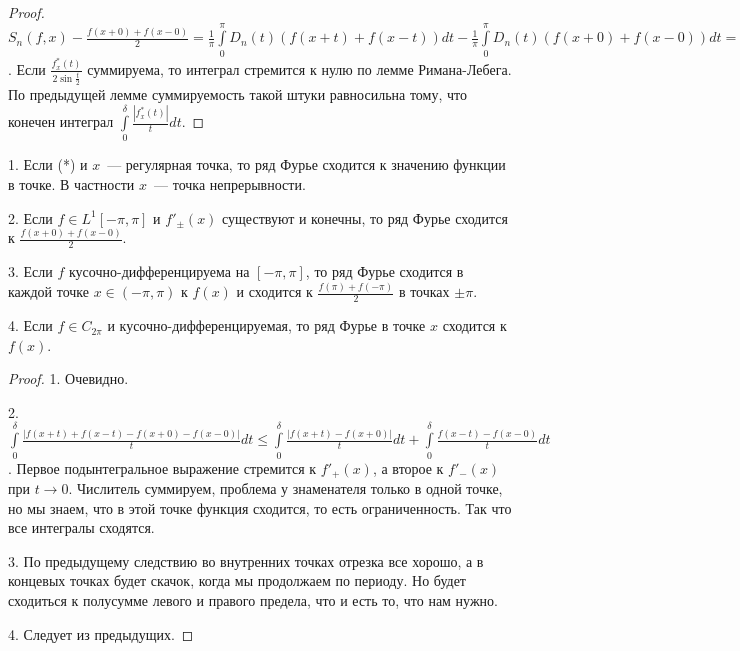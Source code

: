 \begin{proof}
    $S_n(f, x) - \frac{f(x + 0) + f(x - 0)}{2} = \frac{1}{\pi} \int \limits_{0}^{\pi} D_n(t) (f(x + t) + f(x - t)) dt -
        \frac{1}{\pi} \int \limits_{0}^{\pi} D_n(t) (f(x + 0) + f(x - 0)) dt = \frac{1}{\pi} \int \limits_{0}^{\pi} D_n(t) f_x^*(t) dt =
        \frac{1}{\pi} \int \limits_{0}^{\pi} \frac{f_x^*(t)}{2 \sin \frac{t}{2}} \sin (n + \frac{1}{2}) t dt$.
    Если $\frac{f_x^*(t)}{2 \sin \frac{t}{2}}$ суммируема, то интеграл стремится к нулю по лемме Римана-Лебега.
    По предыдущей лемме суммируемость такой штуки равносильна тому, что конечен интеграл
    $\int \limits_{0}^{\delta} \frac{|f_x^*(t)|}{t} dt$.
\end{proof}

\begin{consequence}
    1. Если (*) и $x$~--- регулярная точка, то ряд Фурье сходится к значению функции в точке. В частности $x$~--- точка непрерывности.

    2. Если $f \in L^1 [-\pi, \pi]$ и $f'_{\pm}(x)$ существуют и конечны, то ряд Фурье сходится к $\frac{f(x + 0) + f(x - 0)}{2}$.

    3. Если $f$ кусочно-дифференцируема на $[-\pi, \pi]$, то ряд Фурье сходится в каждой точке $x \in (-\pi, \pi)$ к $f(x)$ и сходится к $\frac{f(\pi) + f(-\pi)}{2}$ в точках $\pm \pi$.

    4. Если $f \in C_{2 \pi}$ и кусочно-дифференцируемая, то ряд Фурье в точке $x$ сходится к $f(x)$.
\end{consequence}

\begin{proof}
    1. Очевидно.

    2. $\int \limits_{0}^{\delta} \frac{|f(x + t) + f(x - t) - f(x + 0) - f(x - 0)|}{t} dt \le
        \int \limits_{0}^{\delta} \frac{|f(x + t) - f(x  +0)|}{t} dt + \int \limits_{0}^{\delta} \frac{f(x - t) - f(x - 0)}{t} dt$.
    Первое подынтегральное выражение стремится к $f'_+(x)$, а второе к $f'_-(x)$ при $t \to 0$.
    Числитель суммируем, проблема у знаменателя только в одной точке, но мы знаем, что в этой точке функция сходится, то есть ограниченность. Так что все интегралы сходятся.

    3. По предыдущему следствию во внутренних точках отрезка все хорошо, а в концевых точках будет скачок, когда мы продолжаем по периоду. Но будет сходиться к полусумме левого и правого предела, что и есть то, что нам нужно.

    4. Следует из предыдущих.
\end{proof}

